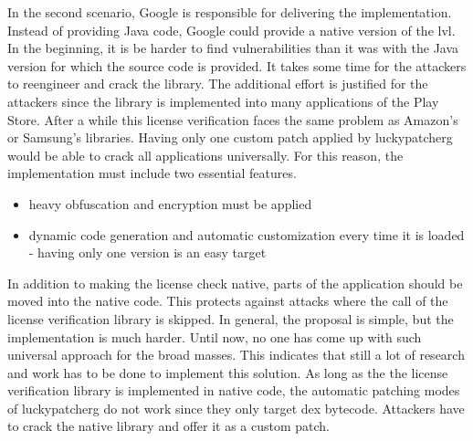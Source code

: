 \newline
In the second scenario, Google is responsible for delivering the implementation.
Instead of providing Java code, Google could provide a native version of the \gls{lvl}.
In the beginning, it is be harder to find vulnerabilities than it was with the Java version for which the source code is provided.
It takes some time for the attackers to reengineer and crack the library.
The additional effort is justified for the attackers since the library is implemented into many applications of the Play Store.
After a while this license verification faces the same problem as Amazon's or Samsung's libraries.
Having only one custom patch applied by \gls{luckypatcherg} would be able to crack all applications universally.
For this reason, the implementation must include two essential features.
\begin{itemize}
\item heavy obfuscation and encryption must be applied
\item dynamic code generation and automatic customization every time it is loaded - having only one version is an easy target
\end{itemize}
In addition to making the license check native, parts of the application should be moved into the native code.
This protects against attacks where the call of the license verification library is skipped.
\newline
\newline
In general, the proposal is simple, but the implementation is much harder.
Until now, no one has come up with such universal approach for the broad masses.
This indicates that still a lot of research  and work has to be done to implement this solution.
\newline
As long as the the license verification library is implemented in native code, the automatic patching modes of \gls{luckypatcherg} do not work since they only target dex bytecode.
Attackers have to crack the native library and offer it as a custom patch.
